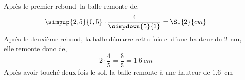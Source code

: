 %
%
    \begin{center}
        
    \end{center}
    Après le premier rebond, la balle remonte de,
    \begin{equation*}
        \simpup{2,5}{0,5}\cdot\dfrac{4}{\simpdown{5}{1}} = \SI{2}{cm}
    \end{equation*}
    Après le deuxième rebond, la balle démarre cette fois-ci d'une hauteur de
    \SI{2}{cm}, elle remonte donc de,
    \begin{equation*}
        2\cdot\dfrac{4}{5} = \dfrac{8}{5} = \SI{1,6}{cm}
    \end{equation*}
    Après avoir touché deux fois le sol, la balle remonte à une hauteur de
    \SI{1,6}{cm}
